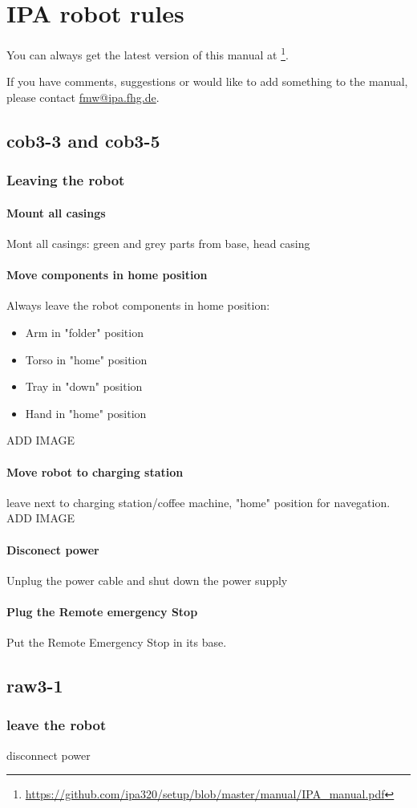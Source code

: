 \chapter{IPA robot rules}
\label{chap:robot-rules} 
You can always get the latest version of this manual at \footnote{\url{https://github.com/ipa320/setup/blob/master/manual/IPA_manual.pdf}}.

If you have comments, suggestions or would like to add something to the manual, please contact \href{mailto:fmw@ipa.fhg.de}{fmw@ipa.fhg.de}.

\section{cob3-3 and cob3-5}
\subsection{Leaving the robot}
\subsubsection{Mount all casings}
Mont all casings: green and grey parts from base, head casing
\subsubsection{Move components in home position}
Always leave the robot components in home position:
\begin{itemize}
\item Arm in "folder" position
\item Torso in "home" position
\item Tray in "down" position
\item Hand in "home" position
\end{itemize}

ADD IMAGE

\subsubsection{Move robot to charging station}
leave next to charging station/coffee machine, "home" position for navegation.
ADD IMAGE

\subsubsection{Disconect power}
Unplug the power cable and shut down the power supply

\subsubsection{Plug the Remote emergency Stop}
Put the Remote Emergency Stop in its base.

\section{raw3-1}
\subsection{leave the robot}

disconnect power